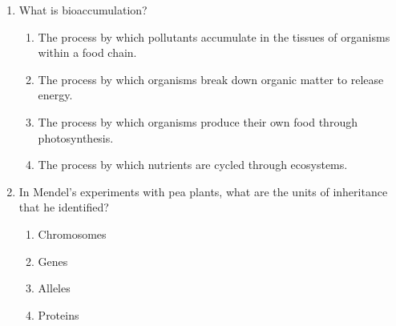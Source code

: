 \documentclass{article}
\begin{document}
\begin{enumerate}
    \item What is bioaccumulation?
    \begin{enumerate}
        \item The process by which pollutants accumulate in the tissues of organisms within a food chain.
        \item The process by which organisms break down organic matter to release energy.
        \item The process by which organisms produce their own food through photosynthesis.
        \item The process by which nutrients are cycled through ecosystems.
    \end{enumerate}

    \item In Mendel's experiments with pea plants, what are the units of inheritance that he identified?
    \begin{enumerate}
        \item Chromosomes
        \item Genes
        \item Alleles
        \item Proteins
    \end{enumerate}

 \end{enumerate}
\end{document}
